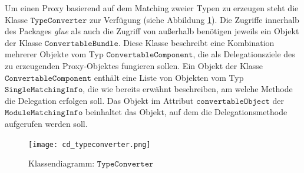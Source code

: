 Um einen Proxy basierend auf dem Matching zweier Typen zu erzeugen steht die Klasse $\texttt{TypeConverter}$ zur Verfügung (siehe Abbildung \ref{cd_typeconverter}). Die Zugriffe innerhalb des Packages \emph{glue} als auch die Zugriff von außerhalb benötigen jeweils ein Objekt der Klasse $\texttt{ConvertableBundle}$. Diese Klasse beschreibt eine Kombination mehrerer Objekte vom Typ $\texttt{ConvertableComponent}$, die als Delegationsziele des zu erzeugenden Proxy-Objektes fungieren sollen. Ein Objekt der Klasse $\texttt{ConvertableComponent}$ enthält eine Liste von Objekten vom Typ $\texttt{SingleMatchingInfo}$, die wie bereits erwähnt beschreiben, am welche Methode die Delegation erfolgen soll. Das Objekt im Attribut $\texttt{convertableObject}$ der $\texttt{ModuleMatchingInfo}$ beinhaltet das Objekt, auf dem die Delegationsmethode aufgerufen werden soll.
\begin{figure}[h!]
\texttt{[image: cd\_typeconverter.png]}
\caption{Klassendiagramm: $\texttt{TypeConverter}$}
\label{cd_typeconverter}
\end{figure}

